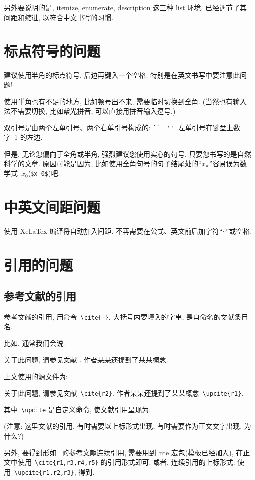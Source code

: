 \documentclass{ice_report}  %
\begin{document}
另外要说明的是,  itemize, enumerate, description 这三种 list 环境, 已经调节了其间距和缩进,
以符合中文书写的习惯.

\section{标点符号的问题}

建议使用半角的标点符号, 后边再键入一个空格. 特别是在英文书写中要注意此问题!

使用半角也有不足的地方, 比如顿号出不来, 需要临时切换到全角. (当然也有输入法不需要切换, 比如紫光拼音, 可以直接用拼音输入逗号.)

双引号是由两个左单引号、两个右单引号构成的: \verb|``  ''|. 左单引号在键盘上数字~1 的左边.

但是, 无论您偏向于全角或半角, 强烈建议您使用实心的句号, 只要您书写的是自然科学的文章.
原因可能是因为, 比如使用全角句号的句子结尾处的``$x$。''容易误为数学式~$x_0$(\verb|$x_0$|)吧.

\section{中英文间距问题}

使用 XeLaTex 编译将自动加入间距. 不再需要在公式、英文前后加字符``\verb|~|''或空格.

\section{引用的问题}


\subsection{参考文献的引用}

参考文献的引用, 用命令~\verb|\cite{ }|. 大括号内要填入的字串, 是自命名的文献条目名.

比如, 通常我们会说:

 {\kaishu
关于此问题, 请参见文献 \cite{r2}. 作者某某还提到了某某概念.}


上文使用的源文件为:

 {\kaishu
关于此问题, 请参见文献~\verb|\cite{r2}|. 作者某某还提到了某某概念~\verb|\upcite{r1}|.
}

其中~\verb|\upcite| 是自定义命令, 使文献引用呈现为.

({\heiti 注意:} {\kaishu 这里文献的引用, 有时需要以上标形式出现, 有时需要作为正文文字出现, 为什么?})

另外, 要得到形如~\cite{r1,r3,r4,r5} 的参考文献连续引用, 需要用到 cite 宏包(模板已经加入),
在正文中使用~\verb|\cite{r1,r3,r4,r5}| 的引用形式即可.
或者, 连续引用的上标形式: 使用~\verb|\upcite{r1,r2,r3}|, 得到.
\end{document}
